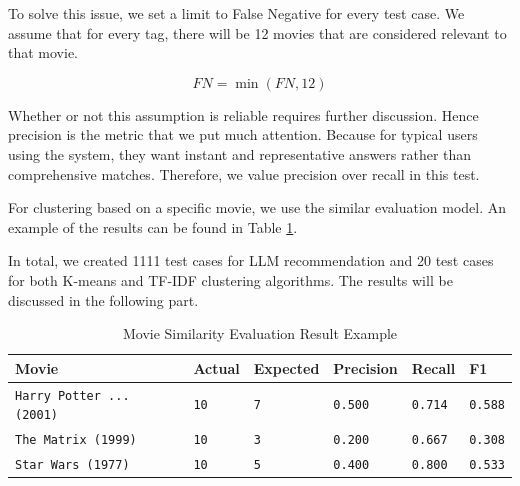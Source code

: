 \documentclass[journal]{IEEEtran}
\theoremstyle{mydefstyle}
\begin{document}
To solve this issue, we set a limit to False Negative for every test case. We assume that for every tag, there will be 12 movies that are considered relevant to that movie.

\[ 
FN = \min(FN, 12)
\]

Whether or not this assumption is reliable requires further discussion. Hence precision is the metric that we put much attention. Because for typical users using the system, they want instant and representative answers rather than comprehensive matches. Therefore, we value precision over recall in this test.

For clustering based on a specific movie, we use the similar evaluation model. An example of the results can be found in Table \ref{tab:similarity_example}.

In total, we created 1111 test cases for LLM recommendation and 20 test cases for both K-means and TF-IDF clustering algorithms. The results will be discussed in the following part.

\begin{table}[ht]
\centering
\scriptsize
\caption{Movie Similarity Evaluation Result Example}
\label{tab:similarity_example}
\begin{tabular}{|>{\centering\arraybackslash}m{1cm}|>{\centering\arraybackslash}m{1cm}|>{\centering\arraybackslash}m{1cm}|>{\centering\arraybackslash}m{1.0cm}|>{\centering\arraybackslash}m{1.0cm}|>{\centering\arraybackslash}m{1.0cm}|}
\hline
\textbf{Movie} & \textbf{Actual} & \textbf{Expected} & \textbf{Precision} & \textbf{Recall} & \textbf{F1} \\
\hline
\texttt{Harry Potter ... (2001)} & \texttt{10} & \texttt{7} & \texttt{0.500} & \texttt{0.714} & \texttt{0.588} \\
\hline
\texttt{The Matrix (1999)} & \texttt{10} & \texttt{3} & \texttt{0.200} & \texttt{0.667} & \texttt{0.308} \\
\hline
\texttt{Star Wars (1977)} & \texttt{10} & \texttt{5} & \texttt{0.400} & \texttt{0.800} & \texttt{0.533} \\
\hline
\end{tabular}
\end{table}
\end{document}
